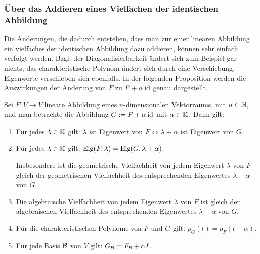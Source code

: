 \subsubsection{Über das Addieren eines Vielfachen der identischen Abbildung}
\label{sec:6_4_3}


Die Änderungen, die dadurch entstehen, dass man zur einer linearen Abbildung ein vielfaches der identischen Abbildung dazu addieren, können sehr einfach verfolgt werden. Bzgl. der Diagonalisierbarkeit ändert sich zum Beispiel gar nichts, das charakteristische Polynom ändert sich durch eine Verschiebung, Eigenwerte verschieben sich ebenfalls. In der folgenden Proposition werden die Auswirkungen der Änderung von $F$ zu $ F + \alpha \operatorname{id}$ genau dargestellt. 

\begin{propn}[Verschiebungstrick]
	Sei $F : V \to V$ lineare Abbildung eines $n$-dimensionalen Vektorraums, mit $n \in \mathbb N$, und man betrachte die Abbildung $G : = F + \alpha \operatorname{id}$ mit $\alpha \in \mathbb K$.  Dann gilt:
	\begin{enumerate}
		\item
			Für jedes $ \lambda \in \mathbb K $ gilt:
			$ \lambda $ ist Eigenwert von $ F \Leftrightarrow \lambda + \alpha $ ist Eigenwert von $ G $.
		\item
			Für jedes $ \lambda \in \mathbb K $ gilt:
			$ \operatorname{Eig}(F,\lambda) = \operatorname{Eig}(G,\lambda + \alpha) $.
			
			Insbesondere ist die geometrische Vielfachheit von jedem Eigenwert $ \lambda $ von $ F $ gleich der geometrischen Vielfachheit des entsprechenden Eigenwertes $ \lambda + \alpha $ von $ G $.
		\item
			Die algebraische Vielfachheit von jedem Eigenwert $ \lambda $ von $ F $ ist gleich der algebraischen Vielfachheit des entsprechenden Eigenwertes $ \lambda + \alpha $ von $ G $.
		\item
			Für die charakteristischen Polynome von $ F $ und $ G $ gilt: $ p_G(t) = p_F(t - \alpha) $.
		\item
			Für jede Basis $ \mathcal{B} $ von $ V $ gilt: $ G_{\mathcal{B}} = F_{\mathcal{B}} + \alpha I $.
	\end{enumerate}
\end{propn}
